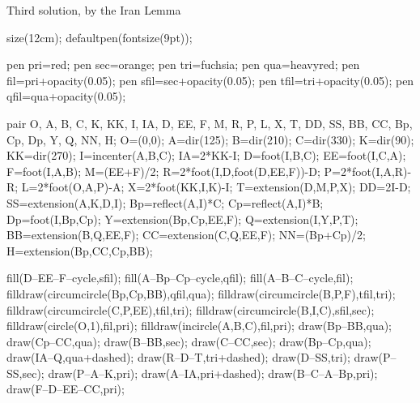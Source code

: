 \begin{customenv}{Third solution, by the Iran Lemma}\
    \begin{center}
        \begin{asy}
            size(12cm);
            defaultpen(fontsize(9pt));

            pen pri=red;
            pen sec=orange;
            pen tri=fuchsia;
            pen qua=heavyred;
            pen fil=pri+opacity(0.05);
            pen sfil=sec+opacity(0.05);
            pen tfil=tri+opacity(0.05);
            pen qfil=qua+opacity(0.05);

            pair O, A, B, C, K, KK, I, IA, D, EE, F, M, R, P, L, X, T, DD, SS, BB, CC, Bp, Cp, Dp, Y, Q, NN, H;
            O=(0,0);
            A=dir(125);
            B=dir(210);
            C=dir(330);
            K=dir(90);
            KK=dir(270);
            I=incenter(A,B,C);
            IA=2*KK-I;
            D=foot(I,B,C);
            EE=foot(I,C,A);
            F=foot(I,A,B);
            M=(EE+F)/2;
            R=2*foot(I,D,foot(D,EE,F))-D;
            P=2*foot(I,A,R)-R;
            L=2*foot(O,A,P)-A;
            X=2*foot(KK,I,K)-I;
            T=extension(D,M,P,X);
            DD=2I-D;
            SS=extension(A,K,D,I);
            Bp=reflect(A,I)*C;
            Cp=reflect(A,I)*B;
            Dp=foot(I,Bp,Cp);
            Y=extension(Bp,Cp,EE,F);
            Q=extension(I,Y,P,T);
            BB=extension(B,Q,EE,F);
            CC=extension(C,Q,EE,F);
            NN=(Bp+Cp)/2;
            H=extension(Bp,CC,Cp,BB);

            fill(D--EE--F--cycle,sfil);
            fill(A--Bp--Cp--cycle,qfil);
            fill(A--B--C--cycle,fil);
            filldraw(circumcircle(Bp,Cp,BB),qfil,qua);
            filldraw(circumcircle(B,P,F),tfil,tri);
            filldraw(circumcircle(C,P,EE),tfil,tri);
            filldraw(circumcircle(B,I,C),sfil,sec);
            filldraw(circle(O,1),fil,pri);
            filldraw(incircle(A,B,C),fil,pri);
            draw(Bp--BB,qua);
            draw(Cp--CC,qua);
            draw(B--BB,sec);
            draw(C--CC,sec);
            draw(Bp--Cp,qua);
            draw(IA--Q,qua+dashed);
            draw(R--D--T,tri+dashed);
            draw(D--SS,tri);
            draw(P--SS,sec);
            draw(P--A--K,pri);
            draw(A--IA,pri+dashed);
            draw(B--C--A--Bp,pri);
            draw(F--D--EE--CC,pri);


\end{asy}
\end{center}
\end{customenv}
